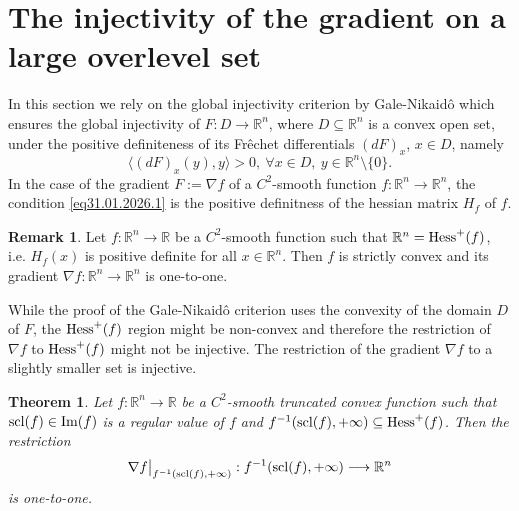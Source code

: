\documentclass[12pt,twoside,reqno]{amsart}
\newtheorem{theorem}{Theorem}[section]
\theoremstyle{definition}
\newtheorem{remark}{Remark}[section]
\numberwithin{equation}{section}
\begin{document}
\section{The injectivity of the gradient on a large overlevel set}
In this section we rely on the global injectivity criterion by Gale-Nikaid\^ o \cite{GaleNikaido} which  ensures the global injectivity of  $F :  D\longrightarrow \mathbb{R}^n$, where $D\subseteq \mathbb{R}^n$ is a convex open set,
under the positive definiteness of its Fr\^ echet differentials $(dF)_x$, $x \in D$, namely
\begin{equation}
\label{eq31.01.2026.1}
\langle (dF)_x(y),y\rangle > 0, \ \forall x \in D, \ y\in \mathbb{R}^n\setminus\{0\}.\end{equation}
In the case of the gradient $F:=\nabla f$ of a $C^2$-smooth function $f: \mathbb{R}^n \longrightarrow \mathbb{R}^n$, the condition \eqref{eq31.01.2026.1} is the positive definitness of the hessian matrix $H_f$ of $f$.
\begin{remark}
Let $f:\mathbb{R}^n\longrightarrow\mathbb{R}$ be a $C^2$-smooth function such that $\mathbb{R}^n={\rm Hess}^+(f)$, i.e. $H_f(x)$ is positive definite
for all $x\in\mathbb{R}^n$. Then $f$ is strictly convex and its gradient $\nabla f:\mathbb{R}^n\longrightarrow\mathbb{R}^n$ is one-to-one. 
\end{remark}
While the proof of the Gale-Nikaid\^ o criterion uses the convexity of the domain $D$ of $F$, the ${\rm Hess}^+(f)$ region might be non-convex and therefore the restriction of $\nabla f$ to ${\rm Hess}^+(f)$ might not be injective. The restriction of the gradient $\nabla f$ to a slightly smaller set is injective.
\begin{theorem}\label{Th15.01.2026.1}
Let $f:\mathbb{R}^n\longrightarrow\mathbb{R}$ be a $C^2$-smooth truncated convex function such that ${\rm scl}(f)\in {\rm Im}(f)$ is
a regular value of $f$ and $f^{-1}({\rm scl}(f),+\infty)\subseteq{\rm Hess}^+(f)$. 
Then the restriction \[\nabla f\big|_{f^{-1}({\rm scl}(f),+\infty)}:f^{-1}({\rm scl}(f),+\infty)\longrightarrow\mathbb{R}^n\]
is one-to-one.
\end{theorem}
\end{document}
